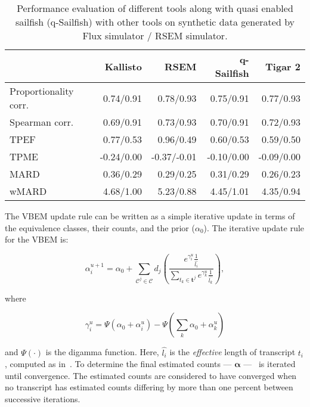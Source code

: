 \begin{table*}
\centering
\caption{Performance evaluation of different tools along with quasi enabled sailfish (q-Sailfish) with other tools on synthetic data generated by Flux simulator / RSEM simulator.}
\label{tab:quant_perf}
\begin{tabulary}{2cm}{lrrrr}
\toprule
\midrule
{} &  Kallisto &  RSEM &  q-Sailfish &  Tigar 2 \\
\midrule
Proportionality corr. &      0.74/0.91 &          0.78/0.93 &              0.75/0.91 &   0.77/0.93 \\
Spearman corr. &      0.69/0.91 &          0.73/0.93 &              0.70/0.91 &   0.72/0.93 \\
TPEF &      0.77/0.53 &          0.96/0.49 &              0.60/0.53 &   0.59/0.50 \\
TPME &     -0.24/0.00 &         -0.37/-0.01 &             -0.10/0.00 &  -0.09/0.00 \\
MARD &      0.36/0.29 &          0.29/0.25 &              0.31/0.29 &   0.26/0.23 \\
wMARD &      4.68/1.00 &          5.23/0.88 &              4.45/1.01 &   4.35/0.94 \\
\bottomrule
\end{tabulary}
\end{table*}

The VBEM update rule can be written as a simple iterative update in terms of the equivalence classes, their counts, and the prior ($\alpha_0$).  The iterative update rule for the VBEM is:

\begin{equation}
\alpha_i^{u+1}  = \alpha_0 + \sum_{\mathcal{C}^j \in \mathcal{C}} d_j \left(
\frac{e^{\gamma_i^{u}} \frac{1}{\hat{l_i}}} {\sum_{t_k \in \mathbf{t}^j}
e^{\gamma_k^{u}} \frac{1}{\hat{l_k}}} \right),
\label{eqn:vbem_update}
\end{equation}

where

\begin{equation}
\gamma_i^{u} = \Psi(\alpha_0 + \alpha_i^u) - \Psi(\sum_{k} \alpha_0 + \alpha_k^u)
\label{eqn:em_update}
\end{equation}

and $\Psi(\cdot)$ is the digamma function. Here, $\hat{l_i}$ is the \textit{effective} length of transcript $t_i$, computed as in~\citet{li2010rna}.  To determine the final estimated counts --- $\bm{\alpha}$ ---~ is iterated until convergence.  The estimated counts are considered to have converged when no transcript has estimated counts differing by more than one percent between successive iterations.

